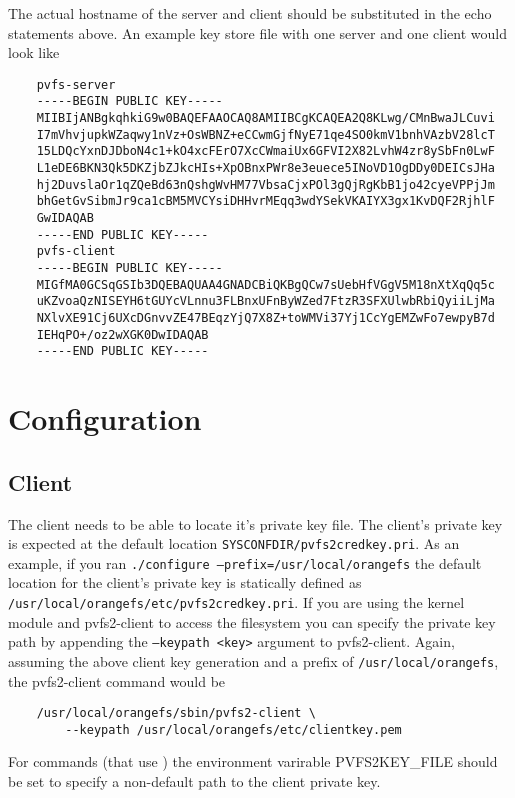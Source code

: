 \documentclass[11pt, letterpaper]{article}
\begin{document}
The actual hostname of the server and client should be substituted in the echo 
statements above. An example key store file with one server and one client 
would look like

\begin{verbatim}
    pvfs-server
    -----BEGIN PUBLIC KEY-----
    MIIBIjANBgkqhkiG9w0BAQEFAAOCAQ8AMIIBCgKCAQEA2Q8KLwg/CMnBwaJLCuvi
    I7mVhvjupkWZaqwy1nVz+OsWBNZ+eCCwmGjfNyE71qe4SO0kmV1bnhVAzbV28lcT
    15LDQcYxnDJDboN4c1+kO4xcFErO7XcCWmaiUx6GFVI2X82LvhW4zr8ySbFn0LwF
    L1eDE6BKN3Qk5DKZjbZJkcHIs+XpOBnxPWr8e3euece5INoVD1OgDDy0DEICsJHa
    hj2DuvslaOr1qZQeBd63nQshgWvHM77VbsaCjxPOl3gQjRgKbB1jo42cyeVPPjJm
    bhGetGvSibmJr9ca1cBM5MVCYsiDHHvrMEqq3wdYSekVKAIYX3gx1KvDQF2RjhlF
    GwIDAQAB
    -----END PUBLIC KEY-----
    pvfs-client
    -----BEGIN PUBLIC KEY-----
    MIGfMA0GCSqGSIb3DQEBAQUAA4GNADCBiQKBgQCw7sUebHfVGgV5M18nXtXqQq5c
    uKZvoaQzNISEYH6tGUYcVLnnu3FLBnxUFnByWZed7FtzR3SFXUlwbRbiQyiiLjMa
    NXlvXE91Cj6UXcDGnvvZE47BEqzYjQ7X8Z+toWMVi37Yj1CcYgEMZwFo7ewpyB7d
    IEHqPO+/oz2wXGK0DwIDAQAB
    -----END PUBLIC KEY-----
\end{verbatim}

\section{Configuration}

\subsection{Client}
The client needs to be able to locate it's private key file. The client's 
private key is expected at the default location 
\texttt{SYSCONFDIR/pvfs2credkey.pri}. As an example, if you ran 
\texttt{./configure --prefix=/usr/local/orangefs} the default location for the 
client's private key is statically defined as 
\texttt{/usr/local/orangefs/etc/pvfs2credkey.pri}. If you are using the kernel 
module and pvfs2-client to access the filesystem you can specify the private 
key path by appending the \texttt{--keypath <key>} argument to pvfs2-client. 
Again, assuming the above client key generation and a prefix of 
\texttt{/usr/local/orangefs}, the pvfs2-client command would be

\begin{verbatim}
    /usr/local/orangefs/sbin/pvfs2-client \
        --keypath /usr/local/orangefs/etc/clientkey.pem
\end{verbatim}

For  commands (that use ) the environment 
varirable PVFS2KEY_FILE should be set to specify a non-default path to the 
client private key.
\end{document}
